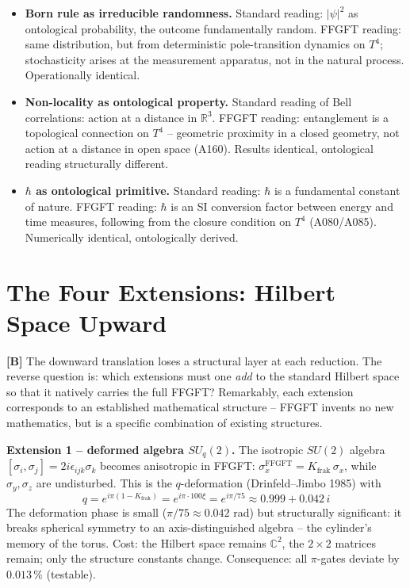 \begin{itemize}[leftmargin=2em,itemsep=3pt,topsep=3pt]
  \item \textbf{Born rule as irreducible randomness.} Standard reading: $|\psi|^2$
    as ontological probability, the outcome fundamentally random. FFGFT reading:
    same distribution, but from deterministic pole-transition dynamics on $T^4$;
    stochasticity arises at the measurement apparatus, not in the natural process.
    Operationally identical.
  \item \textbf{Non-locality as ontological property.} Standard reading of Bell
    correlations: action at a distance in $\mathbb{R}^3$. FFGFT reading:
    entanglement is a topological connection on $T^4$ -- geometric proximity in a
    closed geometry, not action at a distance in open space (A160). Results
    identical, ontological reading structurally different.
  \item \textbf{$\hbar$ as ontological primitive.} Standard reading: $\hbar$ is a
    fundamental constant of nature. FFGFT reading: $\hbar$ is an SI conversion
    factor between energy and time measures, following from the closure condition
    on $T^4$ (A080/A085). Numerically identical, ontologically derived.
\end{itemize}

\section{The Four Extensions: Hilbert Space Upward}

\textbf{[B]} The downward translation loses a structural layer at each reduction.
The reverse question is: which extensions must one \emph{add} to the standard
Hilbert space so that it natively carries the full FFGFT? Remarkably, each
extension corresponds to an established mathematical structure -- FFGFT invents no
new mathematics, but is a specific combination of existing structures.

\textbf{Extension 1 -- deformed algebra $SU_q(2)$.} The isotropic $SU(2)$ algebra
$[\sigma_i,\sigma_j]=2i\epsilon_{ijk}\sigma_k$ becomes anisotropic in FFGFT:
$\sigma_x^{\text{FFGFT}} = K_{\text{frak}}\,\sigma_x$, while $\sigma_y,\sigma_z$
are undisturbed. This is the $q$-deformation (Drinfeld--Jimbo 1985) with
\[
  \boxed{\;q = e^{i\pi(1-K_{\text{frak}})} = e^{i\pi\cdot100\xi} = e^{i\pi/75}
        \approx 0{.}999 + 0{.}042\,i\;}
\]
The deformation phase is small ($\pi/75\approx0{.}042$ rad) but structurally
significant: it breaks spherical symmetry to an axis-distinguished algebra --
the cylinder's memory of the torus. Cost: the Hilbert space remains $\mathbb{C}^2$,
the $2\times2$ matrices remain; only the structure constants change. Consequence:
all $\pi$-gates deviate by $0{.}013\,\%$ (testable).

